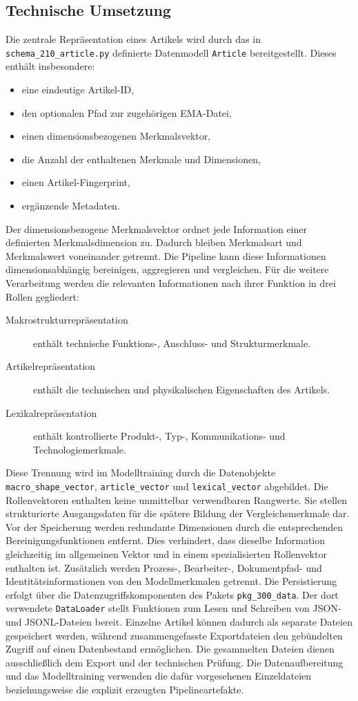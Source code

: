 \subsection{Technische Umsetzung} 
\label{subsec:technische_umsetzung_datenrepraesentationen} 

Die zentrale Repräsentation eines Artikels wird durch das in \texttt{schema\_210\_article.py} definierte Datenmodell \texttt{Article} bereitgestellt. Dieses enthält insbesondere: \begin{itemize} \item eine eindeutige Artikel-ID, \item den optionalen Pfad zur zugehörigen EMA-Datei, \item einen dimensionsbezogenen Merkmalsvektor, \item die Anzahl der enthaltenen Merkmale und Dimensionen, \item einen Artikel-Fingerprint, \item ergänzende Metadaten. \end{itemize} Der dimensionsbezogene Merkmalsvektor ordnet jede Information einer definierten Merkmalsdimension zu. Dadurch bleiben Merkmalsart und Merkmalswert voneinander getrennt. Die Pipeline kann diese Informationen dimensionsabhängig bereinigen, aggregieren und vergleichen. Für die weitere Verarbeitung werden die relevanten Informationen nach ihrer Funktion in drei Rollen gegliedert: \begin{description} \item[Makrostrukturrepräsentation] enthält technische Funktions-, Anschluss- und Strukturmerkmale. \item[Artikelrepräsentation] enthält die technischen und physikalischen Eigenschaften des Artikels. \item[Lexikalrepräsentation] enthält kontrollierte Produkt-, Typ-, Kommunikations- und Technologiemerkmale. \end{description} Diese Trennung wird im Modelltraining durch die Datenobjekte \texttt{macro\_shape\_vector}, \texttt{article\_vector} und \texttt{lexical\_vector} abgebildet. Die Rollenvektoren enthalten keine unmittelbar verwendbaren Rangwerte. Sie stellen strukturierte Ausgangsdaten für die spätere Bildung der Vergleichsmerkmale dar. Vor der Speicherung werden redundante Dimensionen durch die entsprechenden Bereinigungsfunktionen entfernt. Dies verhindert, dass dieselbe Information gleichzeitig im allgemeinen Vektor und in einem spezialisierten Rollenvektor enthalten ist. Zusätzlich werden Prozess-, Bearbeiter-, Dokumentpfad- und Identitätsinformationen von den Modellmerkmalen getrennt. Die Persistierung erfolgt über die Datenzugriffskomponenten des Pakets \texttt{pkg\_300\_data}. Der dort verwendete \texttt{DataLoader} stellt Funktionen zum Lesen und Schreiben von JSON- und JSONL-Dateien bereit. Einzelne Artikel können dadurch als separate Dateien gespeichert werden, während zusammengefasste Exportdateien den gebündelten Zugriff auf einen Datenbestand ermöglichen. Die gesammelten Dateien dienen ausschließlich dem Export und der technischen Prüfung. Die Datenaufbereitung und das Modelltraining verwenden die dafür vorgesehenen Einzeldateien beziehungsweise die explizit erzeugten Pipelineartefakte. 